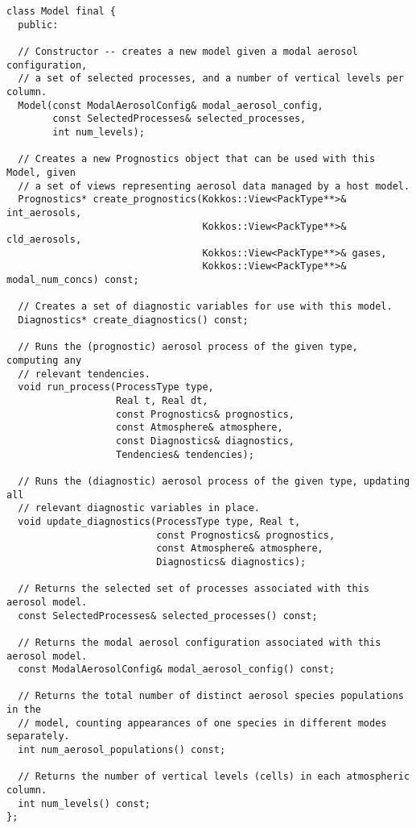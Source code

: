 \begin{lstlisting}
class Model final {
  public:

  // Constructor -- creates a new model given a modal aerosol configuration,
  // a set of selected processes, and a number of vertical levels per column.
  Model(const ModalAerosolConfig& modal_aerosol_config,
        const SelectedProcesses& selected_processes,
        int num_levels);

  // Creates a new Prognostics object that can be used with this Model, given
  // a set of views representing aerosol data managed by a host model.
  Prognostics* create_prognostics(Kokkos::View<PackType**>& int_aerosols,
                                  Kokkos::View<PackType**>& cld_aerosols,
                                  Kokkos::View<PackType**>& gases,
                                  Kokkos::View<PackType**>& modal_num_concs) const;

  // Creates a set of diagnostic variables for use with this model.
  Diagnostics* create_diagnostics() const;

  // Runs the (prognostic) aerosol process of the given type, computing any
  // relevant tendencies.
  void run_process(ProcessType type,
                   Real t, Real dt,
                   const Prognostics& prognostics,
                   const Atmosphere& atmosphere,
                   const Diagnostics& diagnostics,
                   Tendencies& tendencies);

  // Runs the (diagnostic) aerosol process of the given type, updating all
  // relevant diagnostic variables in place.
  void update_diagnostics(ProcessType type, Real t,
                          const Prognostics& prognostics,
                          const Atmosphere& atmosphere,
                          Diagnostics& diagnostics);

  // Returns the selected set of processes associated with this aerosol model.
  const SelectedProcesses& selected_processes() const;

  // Returns the modal aerosol configuration associated with this aerosol model.
  const ModalAerosolConfig& modal_aerosol_config() const;

  // Returns the total number of distinct aerosol species populations in the
  // model, counting appearances of one species in different modes separately.
  int num_aerosol_populations() const;

  // Returns the number of vertical levels (cells) in each atmospheric column.
  int num_levels() const;
};
\end{lstlisting}


